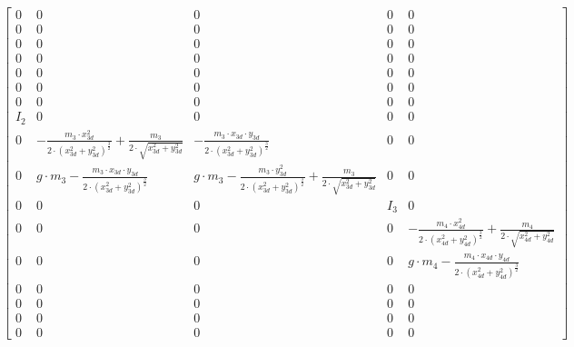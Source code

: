 $$\left[\begin{matrix}0 & 0 & 0 & 0 & 0\\0 & 0 & 0 & 0 & 0\\0 & 0 & 0 & 0 & 0\\0 & 0 & 0 & 0 & 0\\0 & 0 & 0 & 0 & 0\\0 & 0 & 0 & 0 & 0\\0 & 0 & 0 & 0 & 0\\I_{2} & 0 & 0 & 0 & 0\\0 & - \frac{m_{3} \cdot x_{3 d}^{2}}{2 \cdot \left(x_{3 d}^{2} + y_{3 d}^{2}\right)^{\frac{3}{2}}} + \frac{m_{3}}{2 \cdot \sqrt{x_{3 d}^{2} + y_{3 d}^{2}}} & - \frac{m_{3} \cdot x_{3 d} \cdot y_{3 d}}{2 \cdot \left(x_{3 d}^{2} + y_{3 d}^{2}\right)^{\frac{3}{2}}} & 0 & 0\\0 & g \cdot m_{3} - \frac{m_{3} \cdot x_{3 d} \cdot y_{3 d}}{2 \cdot \left(x_{3 d}^{2} + y_{3 d}^{2}\right)^{\frac{3}{2}}} & g \cdot m_{3} - \frac{m_{3} \cdot y_{3 d}^{2}}{2 \cdot \left(x_{3 d}^{2} + y_{3 d}^{2}\right)^{\frac{3}{2}}} + \frac{m_{3}}{2 \cdot \sqrt{x_{3 d}^{2} + y_{3 d}^{2}}} & 0 & 0\\0 & 0 & 0 & I_{3} & 0\\0 & 0 & 0 & 0 & - \frac{m_{4} \cdot x_{4 d}^{2}}{2 \cdot \left(x_{4 d}^{2} + y_{4 d}^{2}\right)^{\frac{3}{2}}} + \frac{m_{4}}{2 \cdot \sqrt{x_{4 d}^{2} + y_{4 d}^{2}}}\\0 & 0 & 0 & 0 & g \cdot m_{4} - \frac{m_{4} \cdot x_{4 d} \cdot y_{4 d}}{2 \cdot \left(x_{4 d}^{2} + y_{4 d}^{2}\right)^{\frac{3}{2}}}\\0 & 0 & 0 & 0 & 0\\0 & 0 & 0 & 0 & 0\\0 & 0 & 0 & 0 & 0\\0 & 0 & 0 & 0 & 0\end{matrix}\right]$$


